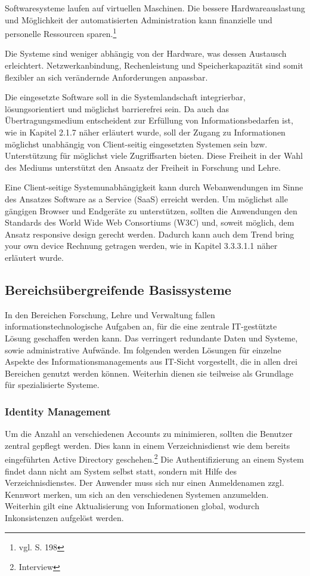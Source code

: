 Softwaresysteme laufen auf virtuellen Maschinen. Die bessere Hardwareauslastung und Möglichkeit der automatisierten Administration kann finanzielle und personelle Ressourcen sparen.\footnote{vgl. \cite{baun_servervirtualisierung_2009} S. 198}

Die Systeme sind weniger abhängig von der Hardware, was dessen Austausch erleichtert. Netzwerkanbindung, Rechenleistung und Speicherkapazität sind somit flexibler an sich verändernde Anforderungen anpassbar.

Die eingesetzte Software soll in die Systemlandschaft integrierbar, lösungsorientiert und möglichst barrierefrei sein. Da auch das Übertragungsmedium entscheident zur Erfüllung von Informationsbedarfen ist, wie in Kapitel 2.1.7 näher erläutert wurde, soll der Zugang zu Informationen möglichst unabhängig von Client-seitig eingesetzten Systemen sein bzw. Unterstützung für möglichst viele Zugriffsarten bieten. Diese Freiheit in der Wahl des Mediums unterstützt den Ansaatz der Freiheit in Forschung und Lehre.

Eine Client-seitige Systemunabhängigkeit kann durch Webanwendungen im Sinne des Ansatzes Software as a Service (SaaS) erreicht werden. Um möglichst alle gängigen Browser und Endgeräte zu unterstützen, sollten die Anwendungen den Standards des World Wide Web Consortiums (W3C) und, soweit möglich, dem Ansatz responsive design gerecht werden. Dadurch kann auch dem Trend bring your own device Rechnung getragen werden, wie in Kapitel 3.3.3.1.1 näher erläutert wurde.

\subsection{Bereichsübergreifende Basissysteme}
In den Bereichen Forschung, Lehre und Verwaltung fallen informationstechnologische Aufgaben an, für die eine zentrale IT-gestützte Lösung geschaffen werden kann. Das verringert redundante Daten und Systeme, sowie administrative Aufwände. Im folgenden werden Lösungen für einzelne Aspekte des Informationsmanagements aus IT-Sicht vorgestellt, die in allen drei Bereichen genutzt werden können. Weiterhin dienen sie teilweise als Grundlage für spezialisierte Systeme.

\subsubsection{Identity Management}
Um die Anzahl an verschiedenen Accounts zu minimieren, sollten die Benutzer zentral gepflegt werden. Dies kann in einem Verzeichnisdienst wie dem bereits eingeführten Active Directory geschehen.\footnote{Interview} Die Authentifizierung an einem System findet dann nicht am System selbst statt, sondern mit Hilfe des Verzeichnisdienstes. Der Anwender muss sich nur einen Anmeldenamen zzgl. Kennwort merken, um sich an den verschiedenen Systemen anzumelden. Weiterhin gilt eine Aktualisierung von Informationen global, wodurch Inkonsistenzen aufgelöst werden.

